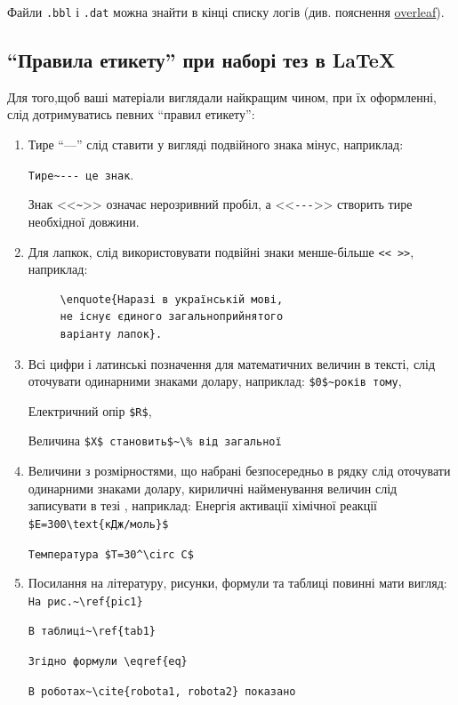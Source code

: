 \documentclass[]{iptconf}
\begin{document}
Файли \texttt{.bbl} і \texttt{.dat} можна знайти в кінці списку логів (див. пояснення
\href{https://www.overleaf.com/help/207-how-do-i-download-the-aux-and-the-bbl-files-my-publisher-asked-me-to-include-them-in-my-submission#.VvMwEnpCh2M}{overleaf}).

\subsection{\enquote{Правила етикету} при наборі тез в \LaTeX}

Для того,щоб ваші матеріали виглядали найкращим чином, при їх оформленні, слід дотримуватись певних \enquote{правил етикету}:

\begin{enumerate}
	\item Тире \enquote{---} слід ставити у вигляді подвійного знака мінус, наприклад:

	      \verb|Тире~--- це знак|.

	      Знак <<\verb|~|>> означає нерозривний пробіл, а <<\verb|---|>> створить тире необхідної довжини.

	\item Для лапкок, слід використовувати подвійні знаки менше-більше \verb|<< >>|, наприклад:
	      \begin{verbatim}
     \enquote{Наразі в українській мові,
     не існує єдиного загальноприйнятого
     варіанту лапок}.
     \end{verbatim}

	\item Всі цифри і латинські позначення для математичних величин в тексті, слід оточувати одинарними знаками долару, наприклад:
	      \verb|$0$~років тому|,

	      Електричний опір \verb|$R$|,

	      Величина \verb|$X$ становить$~\% від загальної|

	\item Величини з розмірностями, що набрані безпосередньо в рядку слід оточувати одинарними знаками долару, кириличні найменування величин слід
	      записувати в тезі \string\text, наприклад:
	      Енергія активації хімічної реакції \verb|$E=300\text{кДж/моль}$|

	      \verb|Температура $T=30^\circ C$|

	\item Посилання на літературу, рисунки, формули та таблиці повинні мати вигляд:
	      \verb|На рис.~\ref{pic1}|

	      \verb|В таблиці~\ref{tab1}|

	      \verb|Згідно формули \eqref{eq}|

	      \verb|В роботах~\cite{robota1, robota2} показано|
\end{enumerate}
\end{document}
